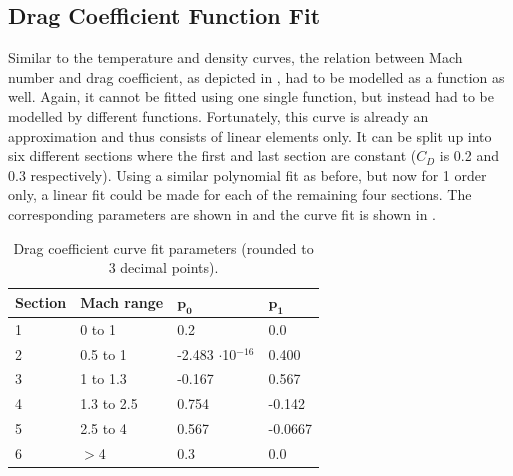 

\subsection{Drag Coefficient Function Fit}
\label{subsec:dragCoefFuncFit}
Similar to the temperature and density curves, the relation between Mach number and drag coefficient, as depicted in , had to be modelled as a function as well. Again, it cannot be fitted using one single function, but instead had to be modelled by different functions. Fortunately, this curve is already an approximation and thus consists of linear elements only. It can be split up into six different sections where the first and last section are constant ($C_{D}$ is 0.2 and 0.3 respectively). Using a similar polynomial fit as before, but now for 1 order only, a linear fit could be made for each of the remaining four sections. The corresponding parameters are shown in  and the curve fit is shown in .

\begin{table}[H]
\begin{center}
\caption{Drag coefficient curve fit parameters (rounded to 3 decimal points).}
\label{tab:dragCoeffPara}
\begin{tabular}{|l|l||l|l|}
\hline 
\textbf{Section}  & \textbf{Mach range}& $\mathbf{p_{0}}$ & $\mathbf{p_{1}}$ \\ \hline 
1 & 0 to 1  & 0.2 & 0.0 \\ \hline
2  & 0.5 to 1   & -2.483 $\cdot$10$^{-16}$ & 0.400 \\ \hline
3  & 1 to 1.3   & -0.167 & 0.567 \\ \hline
4  &  1.3 to 2.5  & 0.754 & -0.142 \\ \hline
5  &  2.5 to 4  & 0.567 & -0.0667 \\ \hline
6 & $>$4  & 0.3 & 0.0 \\ \hline
\end{tabular}
\end{center}
\end{table}



